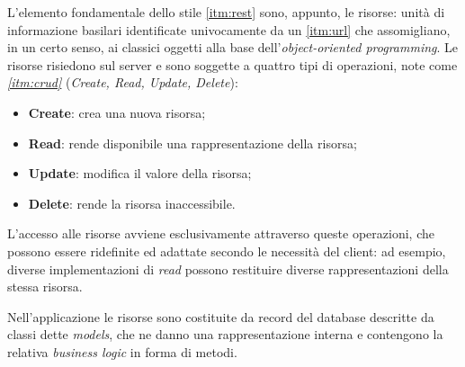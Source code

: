 L'elemento fondamentale dello stile \ref{itm:rest} sono, appunto, le risorse: unità di informazione basilari identificate univocamente da un \ref{itm:url} che assomigliano, in un certo senso, ai classici oggetti alla base dell'\textit{object-oriented programming}. Le risorse risiedono sul server e sono soggette a quattro tipi di operazioni, note come \textit{\ref{itm:crud}} (\textit{Create, Read, Update, Delete}):
\begin{itemize}
    \item \textbf{Create}: crea una nuova risorsa;
    \item \textbf{Read}: rende disponibile una rappresentazione della risorsa;
    \item \textbf{Update}: modifica il valore della risorsa;
    \item \textbf{Delete}: rende la risorsa inaccessibile.
\end{itemize}

L'accesso alle risorse avviene esclusivamente attraverso queste operazioni, che possono essere ridefinite ed adattate secondo le necessità del client: ad esempio, diverse implementazioni di \textit{read} possono restituire diverse rappresentazioni della stessa risorsa.

Nell'applicazione le risorse sono costituite da record del database descritte da classi dette \textit{models}, che ne danno una rappresentazione interna e contengono la relativa \textit{business logic} in forma di metodi.


